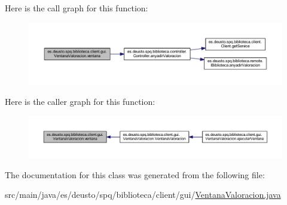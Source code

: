 Here is the call graph for this function\+:
\nopagebreak
\begin{figure}[H]
\begin{center}
\leavevmode
\includegraphics[width=350pt]{classes_1_1deusto_1_1spq_1_1biblioteca_1_1client_1_1gui_1_1_ventana_valoracion_ae8f27fb158d5eb96f275b805f40446e1_cgraph}
\end{center}
\end{figure}
Here is the caller graph for this function\+:
\nopagebreak
\begin{figure}[H]
\begin{center}
\leavevmode
\includegraphics[width=350pt]{classes_1_1deusto_1_1spq_1_1biblioteca_1_1client_1_1gui_1_1_ventana_valoracion_ae8f27fb158d5eb96f275b805f40446e1_icgraph}
\end{center}
\end{figure}


The documentation for this class was generated from the following file\+:\begin{DoxyCompactItemize}
\item 
src/main/java/es/deusto/spq/biblioteca/client/gui/\mbox{\hyperlink{_ventana_valoracion_8java}{Ventana\+Valoracion.\+java}}\end{DoxyCompactItemize}
